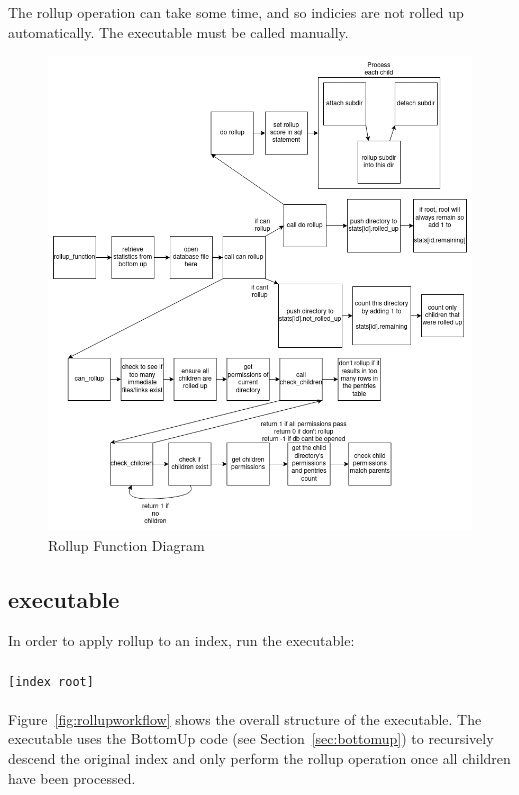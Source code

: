 The rollup operation can take some time, and so indicies are not
rolled up automatically. The \rollup executable must be called
manually.

\begin{figure} [!htb]
  \centering
  \includegraphics[width=\textwidth]{images/rollup_function.png}
  \caption{Rollup Function Diagram}
\end{figure}

\subsection{\rollup executable}
In order to apply rollup to an index, run the \rollup executable:
\\\\
\indent \rollup \texttt{[index root]}
\\\\
Figure~\ref{fig:rollupworkflow} shows the overall structure of the \rollup
executable. The \rollup executable uses the BottomUp code (see
Section~\ref{sec:bottomup}) to recursively descend the original index and only
perform the rollup operation once all children have been processed.

